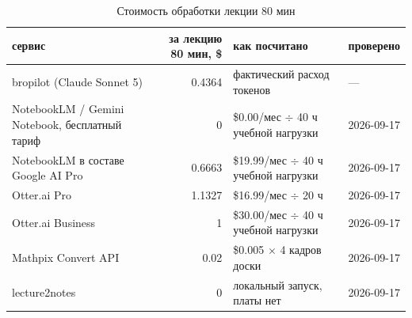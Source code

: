 \begin{table}[H]
\centering
\caption{Стоимость обработки лекции 80 мин}\label{tab:cost-analogs}
\small
\begin{tabular}{@{}lrll@{}}
\toprule
сервис & за лекцию 80 мин, \$ & как посчитано & проверено \\
\midrule
bropilot (Claude Sonnet 5) & 0.4364 & фактический расход токенов & — \\
NotebookLM / Gemini Notebook, бесплатный тариф & 0 & \$0.00/мес $\div$ 40 ч учебной нагрузки & 2026-09-17 \\
NotebookLM в составе Google AI Pro & 0.6663 & \$19.99/мес $\div$ 40 ч учебной нагрузки & 2026-09-17 \\
Otter.ai Pro & 1.1327 & \$16.99/мес $\div$ 20 ч & 2026-09-17 \\
Otter.ai Business & 1 & \$30.00/мес $\div$ 40 ч учебной нагрузки & 2026-09-17 \\
Mathpix Convert API & 0.02 & \$0.005 $\times$ 4 кадров доски & 2026-09-17 \\
lecture2notes & 0 & локальный запуск, платы нет & 2026-09-17 \\
\bottomrule
\end{tabular}
\end{table}
